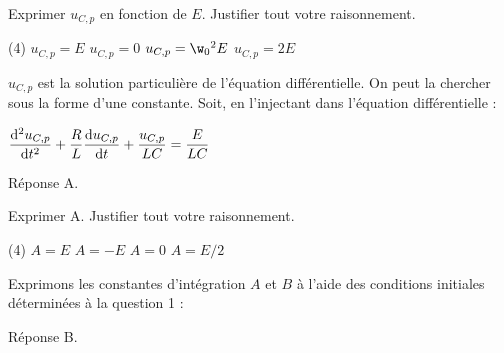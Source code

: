 \documentclass[a4paper, 12pt, final, garamond]{book}
\begin{document}
\QR
{Exprimer $u_{C,p}$ en fonction de $E$. Justifier tout votre raisonnement.

\begin{tasks}[label=\protect\fbox{\Alph*}, label-width=4ex](4)
	\task $u_{C,p}=E$
	\task $u_{C,p}=0$
	\task $u_{C,p}=\w_0{}^2 E$
	\task $u_{C,p}=2E$
\end{tasks}
}{
$u_{C,p}$ est la solution particulière de l’équation différentielle. On peut la
chercher sous la forme d’une constante. Soit, en l’injectant dans l’équation
différentielle :

$\f{\dd^2u_{C,p}}{\dd t^2}+\f{R}{L}\f{\dd u_{C,p}}{\dd t}+\f{u_{C,p}}{LC}=\f{E}{LC}$


\medskip

\noindent
Réponse A.
}

\QR
{Exprimer A. Justifier tout votre raisonnement.
	\begin{tasks}[label=\protect\fbox{\Alph*}, label-width=4ex](4)
		\task $A=E$
		\task $A=-E$
		\task $A=0$
		\task $A=E/2$
	\end{tasks}
}
{
	Exprimons les constantes d’intégration $A$ et $B$ à l’aide des conditions initiales déterminées à la question 1 :



	\medskip

	\noindent
	Réponse B.
}
\end{document}
